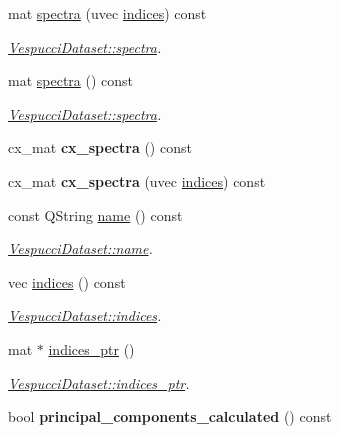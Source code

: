 \begin{DoxyCompactItemize}
\item 
mat \hyperlink{class_vespucci_dataset_ac100f2f4f228ce57b3359a64ed585217}{spectra} (uvec \hyperlink{class_vespucci_dataset_ace7fb38d007d7fdd3c64be5174ae00f8}{indices}) const 
\begin{DoxyCompactList}\small\item\em \hyperlink{class_vespucci_dataset_ac100f2f4f228ce57b3359a64ed585217}{Vespucci\+Dataset\+::spectra}. \end{DoxyCompactList}\item 
mat \hyperlink{class_vespucci_dataset_a97a3d2c679ca8050c9f99fc18ce295bd}{spectra} () const 
\begin{DoxyCompactList}\small\item\em \hyperlink{class_vespucci_dataset_ac100f2f4f228ce57b3359a64ed585217}{Vespucci\+Dataset\+::spectra}. \end{DoxyCompactList}\item 
cx\+\_\+mat {\bfseries cx\+\_\+spectra} () const \hypertarget{class_vespucci_dataset_a01410f0899dff248a1de919d3d410c45}{}\label{class_vespucci_dataset_a01410f0899dff248a1de919d3d410c45}

\item 
cx\+\_\+mat {\bfseries cx\+\_\+spectra} (uvec \hyperlink{class_vespucci_dataset_ace7fb38d007d7fdd3c64be5174ae00f8}{indices}) const \hypertarget{class_vespucci_dataset_a69559177fe81597ab71ace6b016a0f7c}{}\label{class_vespucci_dataset_a69559177fe81597ab71ace6b016a0f7c}

\item 
const Q\+String \hyperlink{class_vespucci_dataset_a345a51b60127316b41caf92dc88fd792}{name} () const 
\begin{DoxyCompactList}\small\item\em \hyperlink{class_vespucci_dataset_a345a51b60127316b41caf92dc88fd792}{Vespucci\+Dataset\+::name}. \end{DoxyCompactList}\item 
vec \hyperlink{class_vespucci_dataset_ace7fb38d007d7fdd3c64be5174ae00f8}{indices} () const 
\begin{DoxyCompactList}\small\item\em \hyperlink{class_vespucci_dataset_ace7fb38d007d7fdd3c64be5174ae00f8}{Vespucci\+Dataset\+::indices}. \end{DoxyCompactList}\item 
mat $\ast$ \hyperlink{class_vespucci_dataset_ab0db3c7619e32824b893878fd6d31ba5}{indices\+\_\+ptr} ()
\begin{DoxyCompactList}\small\item\em \hyperlink{class_vespucci_dataset_ab0db3c7619e32824b893878fd6d31ba5}{Vespucci\+Dataset\+::indices\+\_\+ptr}. \end{DoxyCompactList}\item 
bool {\bfseries principal\+\_\+components\+\_\+calculated} () const \hypertarget{class_vespucci_dataset_a547fc7838091040aef9e86ce8c6e289f}{}\label{class_vespucci_dataset_a547fc7838091040aef9e86ce8c6e289f}


\end{DoxyCompactItemize}
